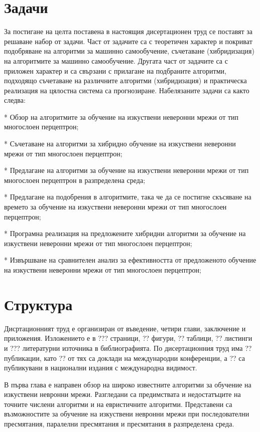 \section*{Задачи}

За постигане на целта поставена в настоящия дисертационен труд се поставят за решаване набор от задачи. Част от задачите са с теоретичен характер и покриват подобряване на алгоритми за машинно самообучение, съчетаване (хибридизация) на алгоритмите за машинно самообучение. Другата част от задачите са с приложен характер и са свързани с прилагане на подбраните алгоритми, подходящо съчетаване на различните алгоритми (хибридизация) и практическа реализация на цялостна система са прогнозиране. Набелязаните задачи са както следва:

* Обзор на алгоритмите за обучение на изкуствени неверонни мрежи от тип многослоен перцептрон;

* Съчетаване на алгоритми за хибридно обучение на изкуствени неверонни мрежи от тип многослоен перцептрон;

* Предлагане на алгоритми за обучение на изкуствени неверонни мрежи от тип многослоен перцептрон в разпределена среда;

* Предлагане на подобрения в алгоритмите, така че да се постигне скъсяване на времето за обучение на изкуствени неверонни мрежи от тип многослоен перцептрон;

* Програмна реализация на предложените хибридни алгоритми за обучение на изкуствени неверонни мрежи от тип многослоен перцептрон;

* Извършване на сравнителен анализ за ефективността от предложеното обучение на изкуствени неверонни мрежи от тип многослоен перцептрон;

\section*{Структура}

Дисртационният труд е организиран от въведение, четири глави, заключение и приложения. Изложението е в ??? страници, ?? фигури, ?? таблици, ?? листинги и ??? литературни източника в библиографията. По дисертационния труд има ?? публикации, като ?? от тях са доклади на международни конференции, а ?? са публикувани в национални издания с международна видимост. 

В първа глава е направен обзор на широко известните алгоритми за обучение на изкуствени невронни мрежи. Разгледани са предимствата и недостатъците на точните числени алгоритми и на евристичните алгоритми. Представени са възможностите за обучение на изкуствени невронни мрежи при последователни пресмятания, паралелни пресмятания и пресмятания в разпределена среда.

